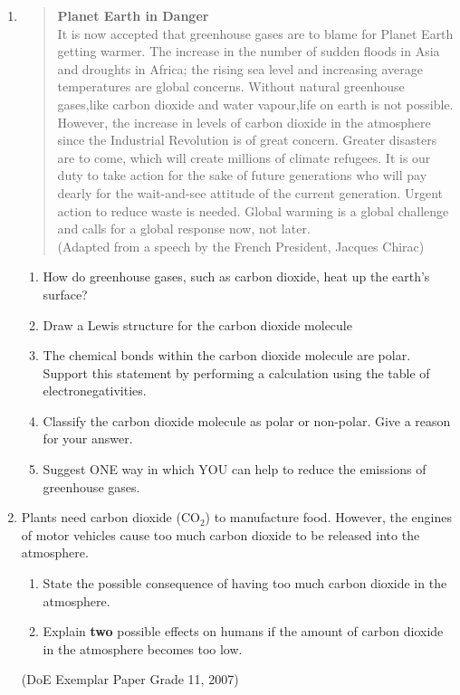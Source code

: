 \begin{eocexercises}{}
\begin{enumerate}
\item{
\begin{quote}
\textbf{Planet Earth in Danger}\\ It is now accepted that greenhouse gases are to blame for Planet Earth getting warmer. The increase in the number of sudden floods in Asia and droughts in Africa; the rising sea level and increasing average temperatures are global concerns. Without natural greenhouse gases,like carbon dioxide and water vapour,life on earth is not possible. However, the increase in levels of carbon dioxide in the atmosphere since the Industrial Revolution is of great concern. Greater disasters are to come, which will create millions of climate refugees. It is our duty to take action for the sake of future generations who will pay dearly for the wait-and-see attitude of the current generation. Urgent action to reduce waste is needed. Global warming is a global challenge and calls for a global response now, not later.\\ (Adapted from a speech by the French President, Jacques Chirac)\\ 

\end{quote}

\begin{enumerate} 
\item How do greenhouse gases, such as carbon dioxide, heat up the earth's surface?\\ 
\item Draw a Lewis structure for the carbon dioxide molecule\\ 
\item The chemical bonds within the carbon dioxide molecule are polar. Support this statement by performing a calculation using the table of electronegativities.\\ 
\item Classify the carbon dioxide molecule as polar or non-polar. Give a reason for your answer.\\ 
\item Suggest ONE way in which YOU can help to reduce the emissions of greenhouse gases.\\ \end{enumerate} 

}

\item{Plants need carbon dioxide (CO$_{2}$) to manufacture food. However, the engines of motor vehicles cause too much carbon dioxide to be released into the atmosphere.}
	\begin{enumerate}
	\item{State the possible consequence of having too much carbon dioxide in the atmosphere.}
	\item{Explain \textbf{two} possible effects on humans if the amount of carbon dioxide in the atmosphere becomes too low.}
	\end{enumerate}

(DoE Exemplar Paper Grade 11, 2007)
\end{enumerate}

\practiceinfo
\end{eocexercises}

